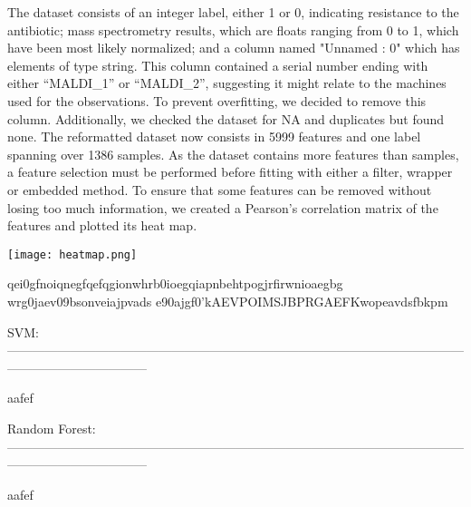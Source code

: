 \documentclass[100pt]{article}
\begin{document}
\begin{normalsize}

The dataset consists of an integer label, either 1 or 0, indicating resistance to the antibiotic; mass spectrometry results, which are floats ranging from 0 to 1, which have been most likely normalized; and a column named "Unnamed : 0" which has elements of type string. This column contained a serial number ending with either “MALDI\_1” or “MALDI\_2”, suggesting it might relate to the machines used for the observations. To prevent overfitting, we decided to remove this column. Additionally, we checked the dataset for NA and duplicates but found none. 
The reformatted dataset now consists in 5999 features and one label spanning over 1386 samples. As the dataset contains more features than samples, a feature selection must be performed before fitting with either a filter, wrapper or embedded method. To ensure that some features can be removed without losing too much information, we created a Pearson's correlation matrix of the features and plotted its heat map.

\centering
\texttt{[image: heatmap.png]}


qei0gfnoiqnegfqefqgionwhrb0ioegqiapnbehtpogjrfirwnioaegbg wrg0jaev09bsonveiajpvads e90ajgf0'kAEVPOIMSJBPRGAEFKwopeavdsfbkpm

\end{normalsize}

\begin{normalsize}\color {bluino}
\hfill\break
\noindent SVM:\\
---------------------------------------------------------------------------------------------------------------------------------------------
\end{normalsize}

\begin{normalsize}

aafef

\end{normalsize}

\begin{normalsize}\color {bluino}
\hfill\break
\noindent Random Forest:\\
---------------------------------------------------------------------------------------------------------------------------------------------
\end{normalsize}

\begin{normalsize}

aafef

\end{normalsize}
\end{document}
